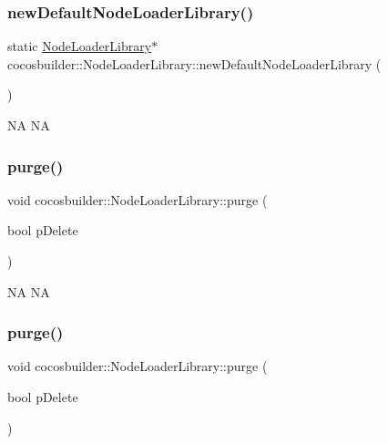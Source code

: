 \subsubsection{\texorpdfstring{new\+Default\+Node\+Loader\+Library()}{newDefaultNodeLoaderLibrary()}\hspace{0.1cm}{\footnotesize\ttfamily [2/2]}}
{\footnotesize\ttfamily static \hyperlink{classcocosbuilder_1_1NodeLoaderLibrary}{Node\+Loader\+Library}$\ast$ cocosbuilder\+::\+Node\+Loader\+Library\+::new\+Default\+Node\+Loader\+Library (\begin{DoxyParamCaption}{ }\end{DoxyParamCaption})\hspace{0.3cm}{\ttfamily [static]}}

NA  NA \mbox{\label{classcocosbuilder_1_1NodeLoaderLibrary_a2957be41c81e744356bf79275e825663}} 
\subsubsection{\texorpdfstring{purge()}{purge()}\hspace{0.1cm}{\footnotesize\ttfamily [1/2]}}
{\footnotesize\ttfamily void cocosbuilder\+::\+Node\+Loader\+Library\+::purge (\begin{DoxyParamCaption}\item[{bool}]{p\+Delete }\end{DoxyParamCaption})}

NA  NA \mbox{\label{classcocosbuilder_1_1NodeLoaderLibrary_a2957be41c81e744356bf79275e825663}} 
\subsubsection{\texorpdfstring{purge()}{purge()}\hspace{0.1cm}{\footnotesize\ttfamily [2/2]}}
{\footnotesize\ttfamily void cocosbuilder\+::\+Node\+Loader\+Library\+::purge (\begin{DoxyParamCaption}\item[{bool}]{p\+Delete }\end{DoxyParamCaption})}

